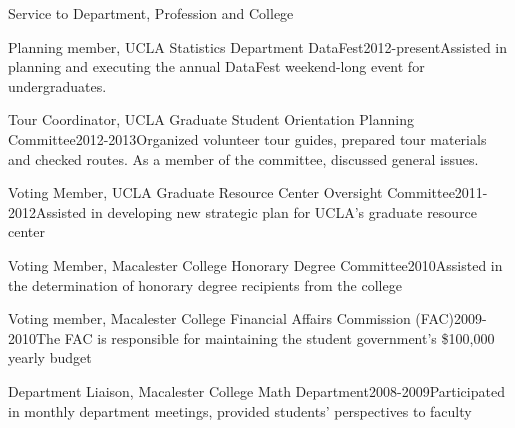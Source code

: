 \documentclass{resume} %
\begin{document}
\begin{rSection}{Service to Department, Profession and College}

\begin{sSubsection}{Planning member, UCLA Statistics Department DataFest}{}{2012-present}{Assisted in planning and executing the annual DataFest weekend-long event for undergraduates.}{}
\end{sSubsection}

\begin{sSubsection}{Tour Coordinator, UCLA Graduate Student Orientation Planning Committee}{}{2012-2013}{Organized volunteer tour guides, prepared tour materials and checked routes. As a member of the committee, discussed general issues.}{}
\end{sSubsection}

\begin{sSubsection}{Voting Member, UCLA Graduate Resource Center Oversight Committee}{}{2011-2012}{Assisted in developing new strategic plan for UCLA's graduate resource center}{}
\end{sSubsection}

\begin{sSubsection}{Voting Member, Macalester College Honorary Degree Committee}{}{2010}{Assisted in the determination of honorary degree recipients from the college}{}
\end{sSubsection}

\begin{sSubsection}{Voting member, Macalester College Financial Affairs Commission (FAC)}{}{2009-2010}{The FAC is responsible for maintaining the student government's \$100,000 yearly budget}{}
\end{sSubsection}

\begin{sSubsection}{Department Liaison, }{Macalester College Math Department}{2008-2009}{Participated in monthly department meetings, provided students' perspectives to faculty}{}
\end{sSubsection}
\end{rSection}

\pagebreak
\end{document}
